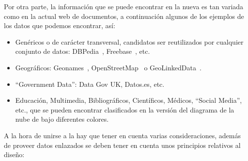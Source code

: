 Por otra parte, la información que se puede encontrar en la nueva \wod es tan variada como en la actual
web de documentos, a continuación algunos de los ejemplos de los datos que podemos encontrar, así:

\begin{itemize}
 \item Genéricos o de carácter transversal, candidatos ser reutilizados por cualquier conjunto de datos: DBPedia~\cite{Bizer:2009:D-C:1640541.1640848}, 
Freebase~\cite{freebase}, etc.
 \item Geográficos: Geonames~\cite{geonames}, OpenStreetMap~\cite{open-street-maps} o GeoLinkedData~\cite{SLHA11}.
 \item ``Government Data'': Data Gov UK, Datos.es, etc.
 \item Educación, Multimedia, Bibliográficos, Científicos, Médicos, ``Social Media'', etc., que se pueden encontrar clasificados
en la versión del diagrama de la nube de \lod bajo diferentes colores.
\end{itemize}

A la hora de unirse a la \wod hay que tener en cuenta varias consideraciones, además de proveer
datos enlazados se deben tener en cuenta unos principios relativos al diseño:

